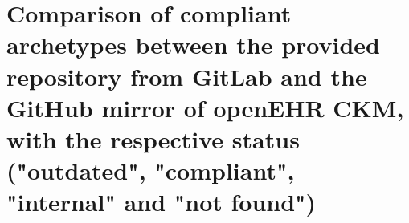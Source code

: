 \documentclass[mim_thesis.tex]{subfiles}
\begin{document}
\section{Comparison of compliant archetypes between the provided repository from GitLab and the GitHub mirror of openEHR CKM, with the respective status ("outdated", "compliant", "internal" and "not found")}



\end{document}
